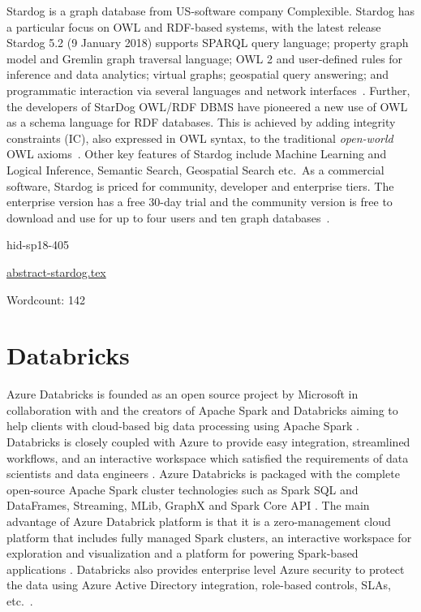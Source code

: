 Stardog is a graph database from US-software company
Complexible. Stardog has a particular focus on OWL and RDF-based
systems, with the latest release Stardog 5.2 (9 January 2018) supports
SPARQL query language; property graph model and Gremlin graph
traversal language; OWL 2 and user-defined rules for inference and
data analytics; virtual graphs; geospatial query answering; and
programmatic interaction via several languages and network
interfaces~\cite{hid-sp18-405-wwwdocs-stardog}. Further, the
developers of StarDog OWL/RDF DBMS have pioneered a new use of OWL as
a schema language for RDF databases. This is achieved by adding
integrity constraints (IC), also expressed in OWL syntax, to the
traditional \textit{open-world} OWL
axioms~\cite{hid-sp18-405-cer2012graphical-stardog}. Other key
features of Stardog include Machine Learning and Logical Inference,
Semantic Search, Geospatial Search etc.\ As a commercial software,
Stardog is priced for community, developer and enterprise tiers. The
enterprise version has a free 30-day trial and the community version
is free to download and use for up to four users and ten graph
databases~\cite{hid-sp18-405-www-stardog}.





\begin{IU}

hid-sp18-405

\href{https://github.com/cloudmesh-community/hid-sp18-405/blob/master//technology/abstract-stardog.tex}{abstract-stardog.tex}

 

Wordcount: 142

\end{IU}

\section{Databricks}

Azure Databricks is founded as an open source project by Microsoft in
collaboration with and the creators of Apache Spark and Databricks aiming to
help clients with cloud-based big data processing using Apache Spark
\cite{hid-sp18-409-www-databricks}. Databricks is closely coupled with Azure to
provide easy integration, streamlined workflows, and an interactive workspace
which satisfied the requirements of data scientists and data engineers
\cite{hid-sp18-409-www-databrick-doc}. Azure Databricks is packaged with the
complete open-source Apache Spark cluster technologies such as Spark SQL and
DataFrames, Streaming, MLib, GraphX and Spark Core API
\cite{hid-sp18-409-www-databrick-doc}. The main advantage of Azure Databrick
platform is that it is a zero-management cloud platform that includes fully
managed Spark clusters, an interactive workspace for exploration and
visualization and a platform for powering Spark-based applications
\cite{hid-sp18-409-www-databricks}. Databricks also provides enterprise level
Azure security to protect the data using Azure Active Directory integration,
role-based controls, SLAs, etc.~\cite{hid-sp18-409-www-databricks}.



